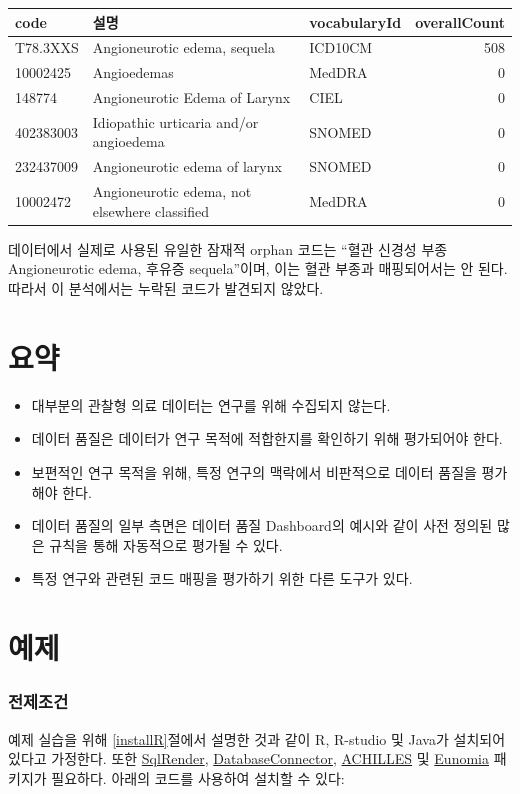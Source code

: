 \documentclass[10.5pt]{book}
\theoremstyle{definition}
\theoremstyle{definition}
\theoremstyle{definition}
\theoremstyle{remark}
\let\BeginKnitrBlock\begin \let\EndKnitrBlock\end
\begin{document}
\begin{longtable}[]{@{}lllr@{}}
\toprule
code & 설명 & vocabularyId & overallCount\tabularnewline
\midrule
\endhead
T78.3XXS & Angioneurotic edema, sequela & ICD10CM & 508\tabularnewline
10002425 & Angioedemas & MedDRA & 0\tabularnewline
148774 & Angioneurotic Edema of Larynx & CIEL & 0\tabularnewline
402383003 & Idiopathic urticaria and/or angioedema & SNOMED &
0\tabularnewline
232437009 & Angioneurotic edema of larynx & SNOMED & 0\tabularnewline
10002472 & Angioneurotic edema, not elsewhere classified & MedDRA &
0\tabularnewline
\bottomrule
\end{longtable}

데이터에서 실제로 사용된 유일한 잠재적 orphan 코드는 ``혈관 신경성 부종
Angioneurotic edema, 후유증 sequela''이며, 이는 혈관 부종과 매핑되어서는
안 된다. 따라서 이 분석에서는 누락된 코드가 발견되지 않았다.

\section{요약}\label{-13}

\BeginKnitrBlock{rmdsummary}
\begin{itemize}
\item
  대부분의 관찰형 의료 데이터는 연구를 위해 수집되지 않는다.
\item
  데이터 품질은 데이터가 연구 목적에 적합한지를 확인하기 위해 평가되어야
  한다.
\item
  보편적인 연구 목적을 위해, 특정 연구의 맥락에서 비판적으로 데이터
  품질을 평가해야 한다.
\item
  데이터 품질의 일부 측면은 데이터 품질 Dashboard의 예시와 같이 사전
  정의된 많은 규칙을 통해 자동적으로 평가될 수 있다.
\item
  특정 연구와 관련된 코드 매핑을 평가하기 위한 다른 도구가 있다.
\end{itemize}
\EndKnitrBlock{rmdsummary}

\section{예제}\label{-9}

\subsubsection*{전제조건}\label{-7}

예제 실습을 위해 \ref{installR}절에서 설명한 것과 같이 R, R-studio 및
Java가 설치되어 있다고 가정한다. 또한
\href{https://ohdsi.github.io/SqlRender/}{SqlRender},
\href{https://ohdsi.github.io/DatabaseConnector/}{DatabaseConnector},
\href{https://github.com/OHDSI/Achilles}{ACHILLES} 및
\href{https://ohdsi.github.io/Eunomia/}{Eunomia} 패키지가 필요하다.
아래의 코드를 사용하여 설치할 수 있다:
\end{document}
